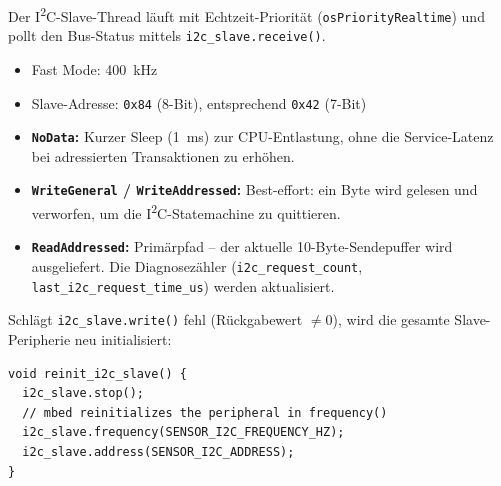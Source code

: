 \label{sec:sensor_i2c}

Der I\textsuperscript{2}C-Slave-Thread läuft mit Echtzeit-Priorität (\texttt{osPriorityRealtime}) und pollt den Bus-Status mittels \texttt{i2c\_slave.receive()}.

\begin{itemize}
  \item Fast Mode: \qty{400}{\kilo\hertz}
  \item Slave-Adresse: \texttt{0x84} (8-Bit), entsprechend \texttt{0x42} (7-Bit)
\end{itemize}

\begin{itemize}
  \item \textbf{\texttt{NoData}:} Kurzer Sleep (\qty{1}{\milli\second}) zur CPU-Entlastung, ohne die Service-Latenz bei adressierten Transaktionen zu erhöhen.
  \item \textbf{\texttt{WriteGeneral} / \texttt{WriteAddressed}:} Best-effort: ein Byte wird gelesen und verworfen, um die I\textsuperscript{2}C-Statemachine zu quittieren.
  \item \textbf{\texttt{ReadAddressed}:} Primärpfad -- der aktuelle 10-Byte-Sendepuffer wird ausgeliefert. Die Diagnosezähler (\texttt{i2c\_request\_count}, \texttt{last\_i2c\_request\_time\_us}) werden aktualisiert.
\end{itemize}

Schlägt \texttt{i2c\_slave.write()} fehl (Rückgabewert $\neq 0$), wird die gesamte Slave-Peripherie neu initialisiert:

\begin{lstlisting}[style=firmwarestyle, caption={Peripheral-Reinitialisierung (\texttt{reinit\_i2c\_slave}, Z.~236--241).}, label={lst:sensor_reinit}]
void reinit_i2c_slave() {
  i2c_slave.stop();
  // mbed reinitializes the peripheral in frequency()
  i2c_slave.frequency(SENSOR_I2C_FREQUENCY_HZ);
  i2c_slave.address(SENSOR_I2C_ADDRESS);
}
\end{lstlisting}

